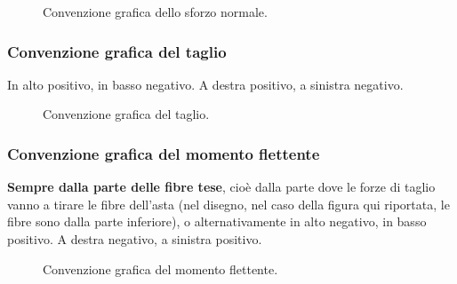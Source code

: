 \documentclass[main.tex]{subfiles}
\begin{document}
\begin{figure}[H]
  \centering
  \resizebox{0.5\textwidth}{!}{}
  \caption{Convenzione grafica dello sforzo normale.}
\end{figure}

\subsubsection{Convenzione grafica del taglio}
In alto positivo, in basso negativo. A destra positivo, a sinistra negativo.

\begin{figure}[H]
  \centering
  \resizebox{0.5\textwidth}{!}{}
  \caption{Convenzione grafica del taglio.}
\end{figure}

\subsubsection{Convenzione grafica del momento flettente}
\textbf{Sempre dalla parte delle fibre tese}, cioè dalla parte dove le forze di taglio vanno a tirare le fibre dell'asta (nel disegno, nel caso della figura qui riportata, le fibre sono dalla parte inferiore), o alternativamente in alto negativo, in basso positivo. A destra negativo, a sinistra positivo.

\begin{figure}[H]
  \centering
  \resizebox{0.5\textwidth}{!}{}
  \caption{Convenzione grafica del momento flettente.}
\end{figure}
\end{document}

